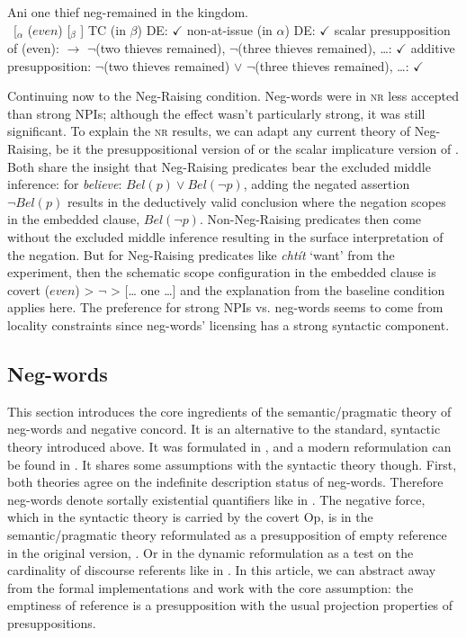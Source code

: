  
\ea\label{ex-12} Ani one thief neg-remained in the kingdom.\\
\ea\label{ex-12-a} ~{[}\(_\alpha\) (\(even\)) {[}\(_\beta\)
  \neg [$_\gamma$ ani one thief remained in the kingdom ]{]} {]} 
\ex TC  (in \(\beta\)) DE: \(\checkmark\) 
\ex non-at-issue (in \(\alpha\)) DE:
  \(\checkmark\) 
\ex\label{ex-12-d} scalar presupposition of (even): \(\rightarrow\)
  \(\neg\)(two thieves remained), \(\neg\)(three thieves remained),
  \ldots: \(\checkmark\)
\ex\label{ex-12-e} additive presupposition: \(\neg\)(two thieves
  remained) \(\vee\) \(\neg\)(three thieves remained), \ldots:
  \(\checkmark\) \z\z

Continuing now to the Neg-Raising condition. Neg-words were in \textsc{nr} less accepted than strong NPIs; although the effect wasn't particularly strong, it was still significant. To explain the \textsc{nr} results, we can adapt any current theory of Neg-Raising, be it the presuppositional version of \citet{gajewski2007neg} or the scalar implicature version of \citet{romoli2013scalar}. Both share the insight that Neg-Raising predicates bear the excluded middle inference: for \textit{believe}: $Bel(p) \vee Bel(\neg p)$, adding the negated assertion $\neg Bel(p)$ results in the deductively valid conclusion where the negation scopes in the embedded clause, $Bel(\neg p)$. Non-Neg-Raising predicates then come without the excluded middle inference resulting in the surface interpretation of the negation. But for Neg-Raising predicates like \textit{chtít} `want' from the experiment, then the schematic scope configuration in the embedded clause is covert (\(even\)) \textgreater{} \(\neg\) \textgreater{} {[}\ldots{} one \ldots{]} and the explanation from the baseline condition applies here. The preference for strong NPIs vs. neg-words seems to come from locality constraints since neg-words' licensing has a strong syntactic component.

\subsection{Neg-words}

This section introduces the core ingredients of the semantic/pragmatic theory of neg-words and negative concord. It is an alternative to the standard, syntactic theory introduced above. It was formulated in \citet{ovalle2004double}, and a modern reformulation can be found in \citet{kuhn2022dynamics}. It shares some assumptions with the syntactic theory though. First, both theories agree on the indefinite description status of neg-words. Therefore neg-words denote sortally existential quantifiers like in . The negative force, which in the syntactic theory is carried by the covert Op, is in the semantic/pragmatic theory reformulated as a presupposition of empty reference in the original version, . Or in the dynamic reformulation as a test on the cardinality of discourse referents like in . In this article, we can abstract away from the formal implementations and work with the core assumption: the emptiness of reference is a presupposition with the usual projection properties of presuppositions. 

